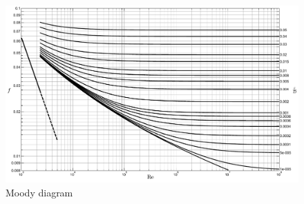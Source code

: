 %	
%		
%		

\begin{figure}[ht]
	\caption{Moody diagram}
	\label{fig:Moody diagram}
	\centering
	\includegraphics[width=22cm, angle=270]{fig/stroming_in_leidingen/Moody_diagram.pdf}
\end{figure}